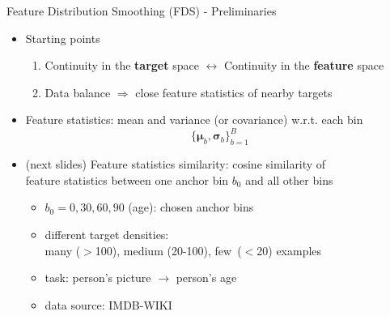 \begin{frame}{Feature Distribution Smoothing (FDS) - Preliminaries}
	\begin{itemize}\setlength\itemsep{1.5em}
		\item<2-> Starting points
		\begin{enumerate}
			\item<2-> Continuity in the \textbf{target} space $\longleftrightarrow$ Continuity in the \textbf{feature} space
			\item<3-> Data balance $\Longrightarrow$ close feature statistics of nearby targets
		\end{enumerate}
		\item<4-> Feature statistics: mean and variance (or covariance) w.r.t. each bin
		\begin{equation*}
			\{\bm{\mu}_b,\bm{\sigma}_b\}_{b=1}^B
		\end{equation*}
		\item<5-> (next slides) Feature statistics similarity: cosine similarity of \\feature statistics between one anchor bin $b_0$ and all other bins
		\begin{itemize}
			\item $b_0 = 0, 30, 60, 90$ (age): chosen anchor bins
			\item different target densities: \\many ($>$100), medium (20-100), few~($<$20) examples
			\item task: person's picture $\longrightarrow$ person's age
			\item data source: IMDB-WIKI
		\end{itemize}
	\end{itemize}
\end{frame}




